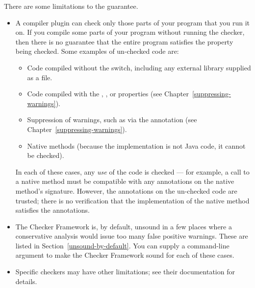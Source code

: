 There are some limitations to the guarantee.


\begin{itemize}

\item
  A compiler plugin can check only those parts of your program that you run
  it on.  If you compile some parts of your program without running the
  checker, then there is no guarantee that the entire program satisfies the
  property being checked.  Some examples of un-checked code are:

  \begin{itemize}
  \item
    Code compiled without the  switch, including any
    external library supplied as a  file.
  \item
    Code compiled with the , ,  or 
    properties (see Chapter~\ref{suppressing-warnings}).
  \item
    Suppression of warnings, such as via the 
    annotation (see Chapter~\ref{suppressing-warnings}).
  \item
    Native methods (because the implementation is not Java code, it cannot
    be checked).
  \end{itemize}

  In each of these cases, any \emph{use} of the code is checked --- for
  example, a call to a native method must be compatible with any
  annotations on the native method's signature.
  However, the annotations on the un-checked code are trusted; there is no
  verification that the implementation of the native method satisfies the
  annotations.

\item
  The Checker Framework is, by default, unsound in a few places where a
  conservative analysis would issue too many false positive warnings.
  These are listed in Section~\ref{unsound-by-default}.
  You can supply a command-line argument to make the Checker Framework
  sound for each of these cases.


\item
  Specific checkers may have other limitations; see their documentation for
  details.

\end{itemize}

